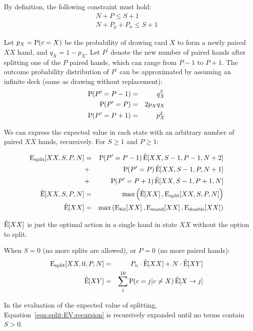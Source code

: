 By definition, the following constraint must hold:
\begin{eqnarray}
N+P \le S+1 \nonumber \\
N+P_p+P_n \le S+1
\end{eqnarray}

\noindent
Let $p_X=\textrm{P}\hspace{-.5ex}\left(c=X\right)$ be the probability of drawing card $X$ to form a 
newly paired $XX$ hand, and $q_X=1-p_X$.
Let $P^\prime$ denote the new number of paired hands after 
splitting one of the $P$ paired hands, which can range from $P-1$ to $P+1$.
The outcome probability distribution of $P^\prime$ can be approximated 
by assuming an infinite deck (same as drawing without replacement):
\begin{eqnarray}
\textrm{P}\hspace{-.5ex}\left(P^\prime=P-1\right) &=& q_X^2 \\
\textrm{P}\hspace{-.5ex}\left(P^\prime=P\right) &=& 2 p_X q_X \\
\textrm{P}\hspace{-.5ex}\left(P^\prime=P+1\right) &=& p_X^2
\end{eqnarray}

\noindent
We can express the expected value in each state
with an arbitrary number of paired $XX$ hands, recursively.
For $S \ge 1$ and $P \ge 1$:

\begin{eqnarray}
\ExpAct{split}{XX,S,P,N} &=& \Prob{P^\prime=P-1}\ExpOpt{XX,S-1,P-1,N+2} \nonumber \\
&+& \Prob{P^\prime=P}\ExpOpt{XX,S-1,P,N+1} \nonumber \\
&+& \Prob{P^\prime=P+1}\ExpOpt{XX,S-1,P+1,N} \label{eqn:split:EV:recursion} \\
\ExpOpt{XX,S,P,N} &=& \Max{\ExpOpt{XX},\ExpAct{split}{XX,S,P,N}} \\
\ExpOpt{XX} &=& \Max{\ExpAct{hit}{XX},\ExpAct{stand}{XX},\ExpAct{double}{XX}}
\end{eqnarray}

\noindent
$\hat{\textrm{E}}\hspace{-.5ex}\left[XX\right]$ is just the optimal action in a single hand in state $XX$
without the option to split.

When $S=0$ (no more splits are allowed), or $P=0$ (no more paired hands):
\begin{eqnarray}
\textrm{E}_{\textrm{split}}\hspace{-.5ex}\left[XX,0,P,N\right] &=& P_n\cdot\hat{\textrm{E}}\hspace{-.5ex}\left[XX\right] +N\cdot\hat{\textrm{E}}\hspace{-.5ex}\left[XY\right]\\
\hat{\textrm{E}}\hspace{-.5ex}\left[XY\right] &=& \sum_{j}^{10}{\textrm{P}\hspace{-.5ex}\left(c=j|c\neq{}X\right) \hat{\textrm{E}}\hspace{-.5ex}\left[X\rightarrow{}j\right]}
\end{eqnarray}

In the evaluation of the expected value of splitting, 
Equation~\ref{eqn:split:EV:recursion} is recursively expanded until
no terms contain $S>0$.

